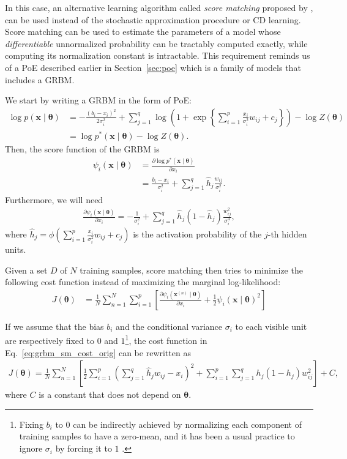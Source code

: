 \documentclass[dissertation,nocontribution,draft*]{aaltoseries}
\newcommand{\vect}[1]{\mathbf{#1}}
\newcommand{\vects}[1]{\boldsymbol{#1}}
\newcommand{\vx}[0]{\vect{x}}
\newcommand{\TT}[0]{{\vects{\theta}}}
\begin{document}
In this case, an alternative learning algorithm called
\textit{score matching} proposed by \citet{Hyvarinen2005},
can be used instead of the stochastic approximation
procedure or CD learning. Score matching can be used to
estimate the parameters of a model whose
\textit{differentiable} unnormalized probability can be
tractably computed exactly, while computing its
normalization constant is intractable. This requirement
reminds us of a PoE described earlier in
Section~\ref{sec:poe} which is a family of models that
includes a GRBM.

We start by writing a GRBM in the form of PoE:
\begin{align}
    \label{eq:grbm_poe}
    \log p(\vx \mid \TT) &= -\frac{(b_i - x_i)^2}{2\sigma_i^2}
    + \sum_{j=1}^q \log \left( 1 + \exp\left\{ \sum_{i=1}^p
    \frac{x_i}{\sigma_i^2} w_{ij} + c_j \right\}\right) -
    \log Z(\TT) 
    \nonumber \\
    &= \log p^*(\vx \mid \TT)  - \log Z(\TT).
\end{align}
Then, the score function of the GRBM is
\begin{align}
    \label{eq:grbm_score}
    \psi_i (\vx \mid \TT) &= \frac{\partial \log p^*(\vx \mid
    \TT)}{\partial x_i} 
    \nonumber \\
    &= \frac{b_i - x_i}{\sigma_i^2} + \sum_{j=1}^q \hat{h}_j
    \frac{w_{ij}}{\sigma_i^2}.
\end{align}
Furthermore, we will need
\begin{align*}
    \frac{\partial \psi_i(\vx \mid \TT)}{\partial x_i} =
    -\frac{1}{\sigma_i^2} + \sum_{j=1}^q \hat{h}_j (1 -
    \hat{h}_j) \frac{w_{ij}^2}{\sigma_i^4},
\end{align*}
where $\hat{h}_j = \phi\left( \sum_{i=1}^p
\frac{x_i}{\sigma_i^2} w_{ij} + c_j \right)$ is the
activation probability of the $j$-th hidden units.

Given a set $D$ of $N$ training samples, score matching
then tries to minimize the following cost function
instead of maximizing the marginal log-likelihood:
\begin{align}
    \label{eq:grbm_sm_cost_orig}
    J(\TT) &= \frac{1}{N} \sum_{n=1}^N \sum_{i=1}^p \left[
    \frac{\partial \psi_i(\vx^{(n)} \mid \TT)}{\partial x_i}
    + \frac{1}{2} \psi_i (\vx \mid \TT)^2
    \right]
\end{align}

If we assume that the bias $b_i$ and the conditional
variance $\sigma_i$ to each visible unit are respectively
fixed to $0$ and $1$\footnote{ Fixing $b_i$ to $0$ can be
indirectly achieved by normalizing each component of
training samples to have a zero-mean, and it has been a
usual practice to ignore $\sigma_i$ by forcing it to $1$
\citep[see, e.g.,][]{Hinton2012rbm}.  }, the cost function in
Eq.~\eqref{eq:grbm_sm_cost_orig} can be rewritten as
\begin{align*}
    J(\TT) = \frac{1}{N} \sum_{n=1}^N \left[ \frac{1}{2}
    \sum_{i=1}^p \left( \sum_{j=1}^q \hat{h}_j w_{ij} - x_i
    \right)^2 + \sum_{i=1}^p \sum_{j=1}^q h_j(1 - h_j)
    w_{ij}^2 \right] + C,
\end{align*}
where $C$ is a constant that does not depend on $\TT$.
\end{document}
